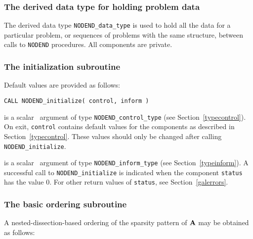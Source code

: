 \documentclass{galahad}
\newcommand{\packagename}{NODEND}
\begin{document}

\subsubsection{The derived data type for holding problem data}\label{typedata}
The derived data type
{\tt \packagename\_data\_type}
is used to hold all the data for a particular problem,
or sequences of problems with the same structure, between calls to
{\tt \packagename} procedures.
All components are private.


\galarguments


\subsubsection{The initialization subroutine}\label{subinit}
 Default values are provided as follows:
\vspace*{1mm}

\hspace{8mm}
{\tt CALL \packagename\_initialize( control, inform )}

\vspace*{-3mm}
\begin{description}

 is a scalar \intentout\ argument of type
{\tt \packagename\_control\_type}
(see Section~\ref{typecontrol}).
On exit, {\tt control} contains default values for the components as
described in Section~\ref{typecontrol}.
These values should only be changed after calling
{\tt \packagename\_initialize}.

 is a scalar \intentout\ argument of type
{\tt \packagename\_inform\_type}
(see Section~\ref{typeinform}). A successful call to
{\tt \packagename\_initialize}
is indicated when the  component {\tt status} has the value 0.
For other return values of {\tt status}, see Section~\ref{galerrors}.

\end{description}


\subsubsection{The basic ordering subroutine}\label{suborder}
A nested-dissection-based ordering of the sparsity pattern of ${\mathbf{A}}$ 
may be obtained as follows:
\vskip2mm
\end{document}
